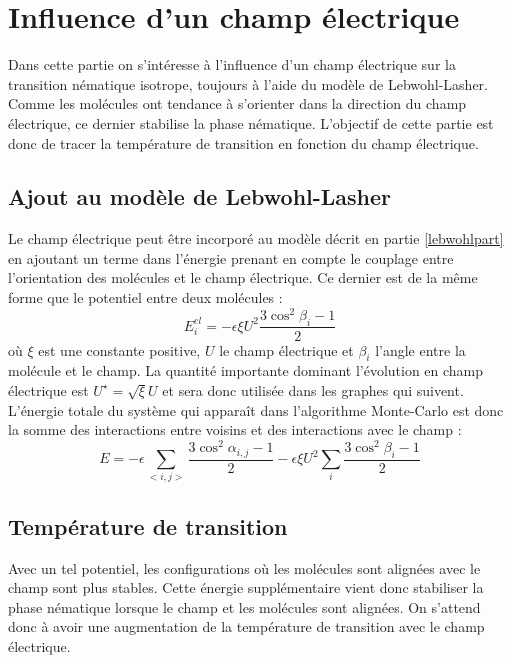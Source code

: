 \documentclass[11pt]{article}
\numberwithin{equation}{section}
\begin{document}
\newpage
\section{Influence d'un champ électrique}


Dans cette partie on s'intéresse à l'influence d'un champ électrique sur la transition nématique isotrope, toujours à l'aide du modèle de Lebwohl-Lasher. Comme les molécules ont tendance à s'orienter dans la direction du champ électrique, ce dernier stabilise la phase nématique. L'objectif de cette partie est donc de tracer la température de transition en fonction du champ électrique.

\subsection{Ajout au modèle de Lebwohl-Lasher}
Le champ électrique peut être incorporé au modèle décrit en partie \ref{lebwohlpart} en ajoutant un terme dans l'énergie prenant en compte le couplage entre l'orientation des molécules et le champ électrique. Ce dernier est de la même forme que le potentiel entre deux molécules \cite{entropicelectric,electric3, biolo}:
\begin{equation}
E_{i}^{el} = - \epsilon \xi U^2 \frac{3\cos^2\beta_i-1}{2}
\label{interactfield}
\end{equation}
où $\xi$ est une constante positive, $U$ le champ électrique et $\beta_{i}$ l'angle entre la molécule et le champ. La quantité importante dominant l'évolution en champ électrique est $U^\star = \sqrt{\xi} U$ et sera donc utilisée dans les graphes qui suivent. L'énergie totale du système qui apparaît dans l'algorithme Monte-Carlo est donc la somme des interactions entre voisins et des interactions avec le champ :
\begin{equation}
E = - \epsilon\sum_{<i,j>} \frac{3\cos^2\alpha_{i,j}-1}{2} - \epsilon \xi U^2 \sum_{i}\frac{3\cos^2\beta_i-1}{2}
\end{equation}

\subsection{Température de transition}
Avec un tel potentiel, les configurations où les molécules sont alignées avec le champ sont plus stables. Cette énergie supplémentaire vient donc stabiliser la phase nématique lorsque le champ et les molécules sont alignées. On s'attend donc à avoir une augmentation de la température de transition avec le champ électrique.
\end{document}
